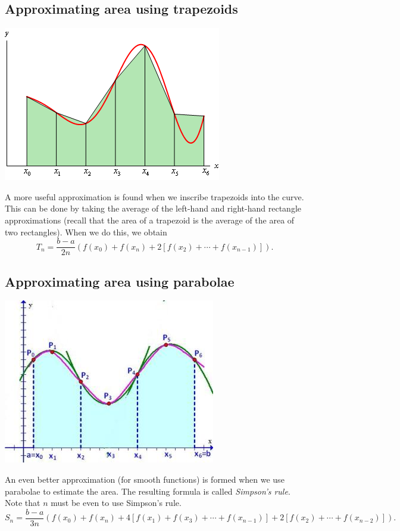\subsection*{Approximating area using trapezoids}
\begin{center}
  \includegraphics[width=0.4\linewidth]{approx-trapezoids}
\end{center}
A more useful approximation is found when we inscribe trapezoids into the curve. This can be done by taking
the average of the left-hand and right-hand rectangle approximations (recall that the area of a trapezoid is
the average of the area of two rectangles). When we do this, we obtain
\begin{displaymath}
  T_n = \frac{b - a}{2n} \left( f(x_0) + f(x_n) + 2\left[f(x_2) + \cdots + f(x_{n - 1})\right] \right).
\end{displaymath}

\subsection*{Approximating area using parabolae}
\begin{center}
  \includegraphics[width=0.4\linewidth]{approx-parabolae}
\end{center}
An even better approximation (for smooth functions) is formed when we use parabolae to estimate the area. The
resulting formula is called \textit{Simpson's rule}. Note that $ n $ must be even to use Simpson's rule.
\begin{displaymath}
  S_n = \frac{b - a}{3n} \left( f(x_0) + f(x_n) + 4\left[f(x_1) + f(x_3) + \cdots + f(x_{n - 1})\right] + 2\left[ f(x_2) + \cdots + f(x_{n - 2}) \right] \right).
\end{displaymath}

